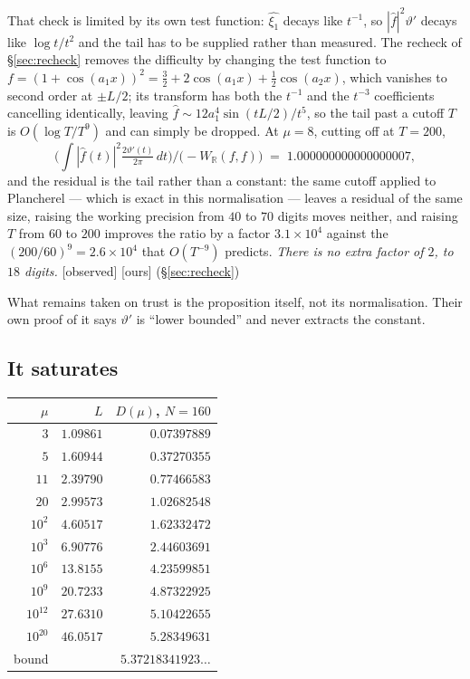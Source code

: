 \documentclass[11pt,a4paper]{article}
\theoremstyle{plain}
\theoremstyle{definition}
\theoremstyle{remark}
\newcommand{\st}[1]{{\normalfont\sffamily\footnotesize[#1]}}
\newcommand{\observed}{\st{observed}}
\newcommand{\ours}{{\normalfont\sffamily\footnotesize[ours]}}
\newcommand{\R}{\mathbb{R}}
\begin{document}
That check is limited by its own test function: $\widehat{\xi_1}$ decays like
$t^{-1}$, so $|\widehat f|^2\vartheta'$ decays like $\log t/t^2$ and the tail has
to be supplied rather than measured.  The recheck of \S\ref{sec:recheck} removes
the difficulty by changing the test function to
$f=(1+\cos(a_1x))^2=\tfrac32+2\cos(a_1x)+\tfrac12\cos(a_2x)$, which vanishes to
second order at $\pm L/2$; its transform has both the $t^{-1}$ and the $t^{-3}$
coefficients cancelling identically, leaving
$\widehat f\sim12a_1^4\sin(tL/2)/t^5$, so the tail past a cutoff $T$ is
$O(\log T/T^9)$ and can simply be dropped.  At $\mu=8$, cutting off at $T=200$,
\[
  \Big(\int|\widehat f(t)|^2\tfrac{2\vartheta'(t)}{2\pi}\,dt\Big)
  \Big/\big(-W_\R(f,f)\big)\;=\;1.000000000000000007 ,
\]
and the residual is the tail rather than a constant: the same cutoff applied to
Plancherel --- which is exact in this normalisation --- leaves a residual of the
same size, raising the working precision from $40$ to $70$ digits moves neither,
and raising $T$ from $60$ to $200$ improves the ratio by a factor
$3.1\times10^4$ against the
$(200/60)^9=2.6\times10^4$ that $O(T^{-9})$ predicts.  \emph{There is no extra
factor of $2$, to $18$ digits.} \observed{} \ours{} (\S\ref{sec:recheck})

What remains taken on trust is the proposition itself, not its normalisation.
Their own proof of it says $\vartheta'$ is ``lower bounded'' and never extracts
the constant.

\subsection{It saturates}

\begin{center}\small
\begin{tabular}{@{}rrr@{}}
\hline
$\mu$ & $L$ & $D(\mu)$, $N=160$ \\
\hline
$3$ & $1.09861$ & $0.07397889$ \\
$5$ & $1.60944$ & $0.37270355$ \\
$11$ & $2.39790$ & $0.77466583$ \\
$20$ & $2.99573$ & $1.02682548$ \\
$10^{2}$ & $4.60517$ & $1.62332472$ \\
$10^{3}$ & $6.90776$ & $2.44603691$ \\
$10^{6}$ & $13.8155$ & $4.23599851$ \\
$10^{9}$ & $20.7233$ & $4.87322925$ \\
$10^{12}$ & $27.6310$ & $5.10422655$ \\
$10^{20}$ & $46.0517$ & $5.28349631$ \\
\hline
bound & & $5.37218341923\ldots$ \\
\hline
\end{tabular}
\end{center}
\end{document}
